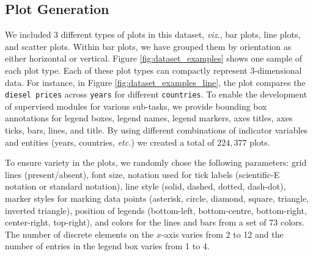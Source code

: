 \documentclass[10pt,twocolumn,letterpaper]{article}
\begin{document}
\subsection{Plot Generation}
We included 3 different types of plots in this dataset, \textit{viz.}, bar plots, line plots, and scatter plots.
Within bar plots, we have grouped them by orientation as either horizontal or vertical. 
Figure \ref{fig:dataset_examples} shows one sample of each plot type. 
Each of these plot types can compactly represent 3-dimensional data. 
For instance, in Figure \ref{fig:dataset_examples_line}, the plot compares the \texttt{diesel prices} across \texttt{years} for different \texttt{countries}. 
To enable the development of supervised modules for various sub-tasks, we provide bounding box annotations for legend boxes, legend names, legend markers, axes titles, axes ticks, bars, lines, and title. 
By using different combinations of indicator variables and entities (years, countries, \textit{etc.}) we created a total of $224,377$ plots. 

To ensure variety in the plots, we randomly chose the following parameters: grid lines (present/absent), font size, notation used for tick labels (scientific-E notation or standard notation), line style (solid, dashed, dotted, dash-dot), marker styles for marking data points (asterisk, circle, diamond, square, triangle, inverted triangle), position of legends (bottom-left, bottom-centre, bottom-right, center-right, top-right), and colors for the lines and bars from a set of 73 colors. 
The number of discrete elements on the $x$-axis varies from 2 to 12 and the number of entries in the legend box varies from 1 to 4. 
\end{document}
